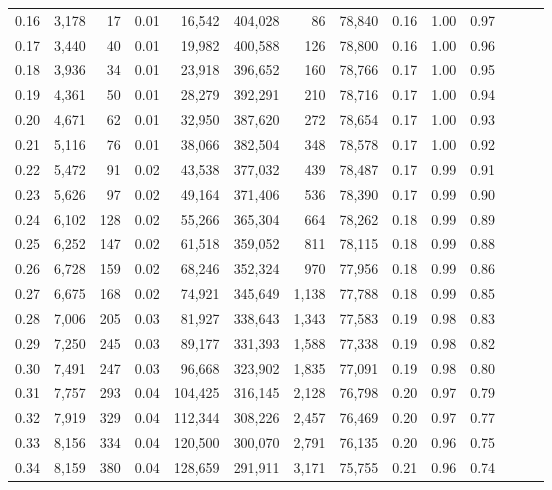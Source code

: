 \begin{tabular}{rrrrrrrrrrrrrr}
0.16 &  3,178 &     17 &  0.01 &   16,542 &  404,028 &      86 &  78,840 &  0.16 &  1.00 &      0.97 \\
0.17 &  3,440 &     40 &  0.01 &   19,982 &  400,588 &     126 &  78,800 &  0.16 &  1.00 &      0.96 \\
0.18 &  3,936 &     34 &  0.01 &   23,918 &  396,652 &     160 &  78,766 &  0.17 &  1.00 &      0.95 \\
0.19 &  4,361 &     50 &  0.01 &   28,279 &  392,291 &     210 &  78,716 &  0.17 &  1.00 &      0.94 \\
0.20 &  4,671 &     62 &  0.01 &   32,950 &  387,620 &     272 &  78,654 &  0.17 &  1.00 &      0.93 \\
0.21 &  5,116 &     76 &  0.01 &   38,066 &  382,504 &     348 &  78,578 &  0.17 &  1.00 &      0.92 \\
0.22 &  5,472 &     91 &  0.02 &   43,538 &  377,032 &     439 &  78,487 &  0.17 &  0.99 &      0.91 \\
0.23 &  5,626 &     97 &  0.02 &   49,164 &  371,406 &     536 &  78,390 &  0.17 &  0.99 &      0.90 \\
0.24 &  6,102 &    128 &  0.02 &   55,266 &  365,304 &     664 &  78,262 &  0.18 &  0.99 &      0.89 \\
0.25 &  6,252 &    147 &  0.02 &   61,518 &  359,052 &     811 &  78,115 &  0.18 &  0.99 &      0.88 \\
0.26 &  6,728 &    159 &  0.02 &   68,246 &  352,324 &     970 &  77,956 &  0.18 &  0.99 &      0.86 \\
0.27 &  6,675 &    168 &  0.02 &   74,921 &  345,649 &   1,138 &  77,788 &  0.18 &  0.99 &      0.85 \\
0.28 &  7,006 &    205 &  0.03 &   81,927 &  338,643 &   1,343 &  77,583 &  0.19 &  0.98 &      0.83 \\
0.29 &  7,250 &    245 &  0.03 &   89,177 &  331,393 &   1,588 &  77,338 &  0.19 &  0.98 &      0.82 \\
0.30 &  7,491 &    247 &  0.03 &   96,668 &  323,902 &   1,835 &  77,091 &  0.19 &  0.98 &      0.80 \\
0.31 &  7,757 &    293 &  0.04 &  104,425 &  316,145 &   2,128 &  76,798 &  0.20 &  0.97 &      0.79 \\
0.32 &  7,919 &    329 &  0.04 &  112,344 &  308,226 &   2,457 &  76,469 &  0.20 &  0.97 &      0.77 \\
0.33 &  8,156 &    334 &  0.04 &  120,500 &  300,070 &   2,791 &  76,135 &  0.20 &  0.96 &      0.75 \\
0.34 &  8,159 &    380 &  0.04 &  128,659 &  291,911 &   3,171 &  75,755 &  0.21 &  0.96 &      0.74 \\

\end{tabular}
